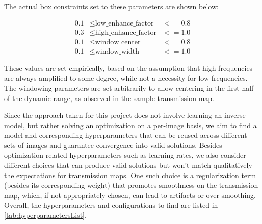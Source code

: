 \documentclass[nomenclature, english, bibtex]{kththesis}
\numberwithin{listing}{chapter}
\begin{document}
The actual box constraints set to these parameters are shown below:

\begin{equation}
\begin{aligned}
    0.1 & \leq  \text{low\_enhance\_factor} & <= 0.8 \\
    0.3 & \leq  \text{high\_enhance\_factor} & <= 1.0 \\
    0.1 & \leq  \text{window\_center} & <= 0.8 \\
    0.1 & \leq  \text{window\_width} & <= 1.0
\end{aligned}
\end{equation}

These values are set empirically, based on the assumption that high-frequencies are always amplified to some degree,
while not a necessity for low-frequencies. The windowing parameters are set arbitrarily to allow centering in the first
half of the dynamic range, as observed in the sample transmission map.

Since the approach taken for this project does not involve learning an inverse model, but rather solving an optimization
on a per-image basis, we aim to find a model and corresponding hyperparameters that can be reused across different
sets of images and guarantee convergence into valid solutions. Besides optimization-related hyperparameters such as
learning rates, we also consider different choices that can produce valid solutions but won't match qualitatively
the expectations for transmission maps. One such choice is a regularization term (besides its corresponding weight)
that promotes smoothness on the transmission map, which, if not appropriately chosen, can lead to artifacts or over-smoothing.
Overall, the hyperparameters and configurations to find are listed in \autoref{tab:hyperparametersList}.
\end{document}
